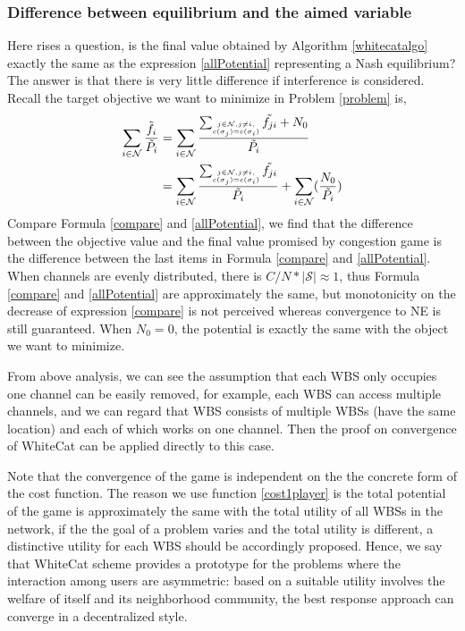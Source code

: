\subsubsection{Difference between equilibrium and the aimed variable}
Here rises a question, is the final value obtained by Algorithm \ref{whitecatalgo} exactly the same as the expression \ref{allPotential} representing a Nash equilibrium? The answer is that there is very little difference if interference is considered.
Recall the target objective we want to minimize in Problem \ref{problem} is,
\begin{equation}
\label{compare}
\begin{split}	
\sum_{i\in \mathcal{N}}\dfrac{\tilde{f_i}}{\tilde{P_i}}
& = \sum\limits_{i\in \mathcal{N}}\dfrac{\sum_{\tiny\substack{j\in \mathcal{N}, j\ne i,\\ c(\sigma_j)=c(\sigma_i)}}\tilde{f_{ji}}+N_0}{\tilde{P_i}}\\
& = \sum\limits_{i\in \mathcal{N}}\dfrac{\sum_{\tiny\substack{j\in \mathcal{N}, j\ne i,\\ c(\sigma_j)=c(\sigma_i)}}\tilde{f_{ji}}}{\tilde{P_i}} + \sum\limits_{i\in \mathcal{N}}  (\dfrac{N_0}{\tilde{P_i}})\\
\end{split}
\end{equation}
Compare Formula \ref{compare} and \ref{allPotential}, we find that the difference between the objective value and the final value promised by congestion game is the difference between the last items in Formula \ref{compare} and \ref{allPotential}. When channels are evenly distributed, there is $C/N*\mid \mathcal{S}\mid\approx 1$, thus Formula \ref{compare} and \ref{allPotential} are approximately the same, but monotonicity on the decrease of expression \ref{compare} is not perceived whereas convergence to NE is still guaranteed. When $N_0=0$, the potential is exactly the same with the object we want to minimize.

From above analysis, we can see the assumption that each WBS only occupies one channel can be easily removed, for example, each WBS can access multiple channels, and we can regard that WBS consists of multiple WBSs (have the same location) and each of which works on one channel. Then the proof on convergence of WhiteCat can be applied directly to this case.

Note that the convergence of the game is independent on the the concrete form of the cost function. The reason we use function \ref{cost1player} is the total potential of the game is approximately the same with the total utility of all WBSs in the network, if the the goal of a problem varies and the total utility is different, a distinctive utility for each WBS should be accordingly proposed. Hence, we say that WhiteCat scheme provides a prototype for the problems where the interaction among users are asymmetric: based on a suitable utility involves the welfare of itself and its neighborhood community, the best response approach can converge in a decentralized style.

